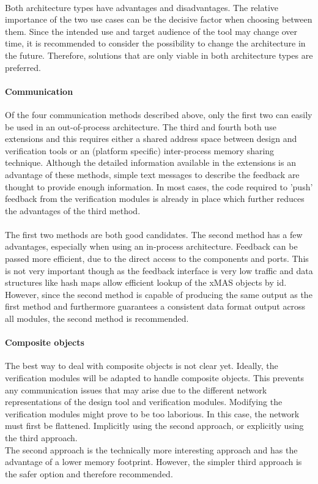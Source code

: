\documentclass[a4paper,11pt]{article}
\begin{document}
\paragraph{}
Both architecture types have advantages and disadvantages. The relative importance
of the two use cases can be the decisive factor when choosing between them. Since
the intended use and target audience of the tool may change over time, it is
recommended to consider the possibility to change the architecture in the future.
Therefore, solutions that are only viable in both architecture types are preferred.


\paragraph{Communication}
Of the four communication methods described above, only the first two can easily be
used in an out-of-process architecture. The third and fourth both use extensions
and this requires either a shared address space between design and verification 
tools or an (platform specific) inter-process memory sharing technique. Although
the detailed information available in the extensions is an advantage of these methods,
simple text messages to describe the feedback are thought to provide enough information.
In most cases, the code required to 'push' feedback from the verification modules
is already in place which further reduces the advantages of the third method.

\paragraph{}
The first two methods are both good candidates. The second method has a few advantages,
especially when using an in-process architecture. Feedback can be passed more efficient,
due to the direct access to the components and ports. This is not very important though
as the feedback interface is very low traffic and data structures like hash maps allow
efficient lookup of the xMAS objects by id. However, since the second method is capable
of producing the same output as the first method and furthermore guarantees a consistent
data format output across all modules, the second method is recommended.

\paragraph{Composite objects}
The best way to deal with composite objects is not clear yet. Ideally, the verification
modules will be adapted to handle composite objects. This prevents any communication
issues that may arise due to the different network representations of the design tool
and verification modules. Modifying the verification modules might prove to be too
laborious. In this case, the network must first be flattened. Implicitly using the
second approach, or explicitly using the third approach.\\
The second approach is the technically more interesting approach and has the advantage
of a lower memory footprint. However, the simpler third approach is the safer option
and therefore recommended.
\end{document}

